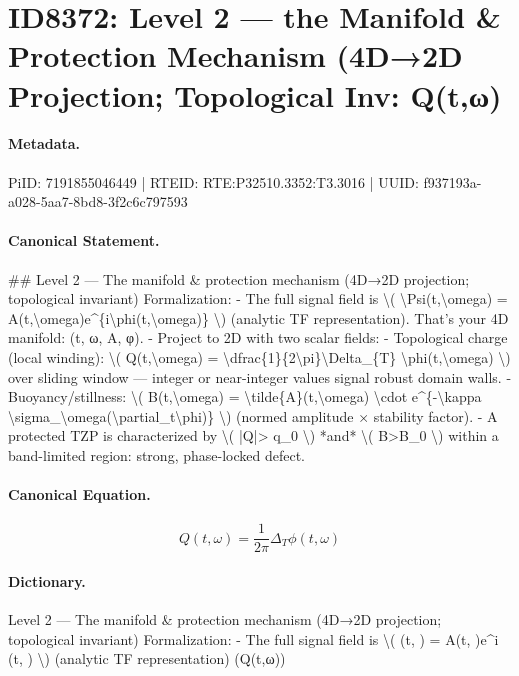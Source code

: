 \section*{ID8372: Level 2 — the Manifold \& Protection Mechanism (4D→2D Projection; Topological Inv: Q(t,ω)}
\paragraph{Metadata.}
PiID: 7191855046449 | RTEID: RTE:P32510.3352:T3.3016 | UUID: f937193a-a028-5aa7-8bd8-3f2c6c797593

\paragraph{Canonical Statement.}
\#\# Level 2 — The manifold \& protection mechanism (4D→2D projection; topological invariant) Formalization: - The full signal field is \textbackslash{}( \textbackslash{}Psi(t,\textbackslash{}omega) = A(t,\textbackslash{}omega)e\textasciicircum{}\{i\textbackslash{}phi(t,\textbackslash{}omega)\} \textbackslash{}) (analytic TF representation). That’s your 4D manifold: (t, ω, A, φ). - Project to 2D with two scalar fields: - Topological charge (local winding): \textbackslash{}( Q(t,\textbackslash{}omega) = \textbackslash{}dfrac\{1\}\{2\textbackslash{}pi\}\textbackslash{}Delta\_\{T\} \textbackslash{}phi(t,\textbackslash{}omega) \textbackslash{}) over sliding window — integer or near-integer values signal robust domain walls. - Buoyancy/stillness: \textbackslash{}( B(t,\textbackslash{}omega) = \textbackslash{}tilde\{A\}(t,\textbackslash{}omega) \textbackslash{}cdot e\textasciicircum{}\{-\textbackslash{}kappa \textbackslash{}sigma\_\textbackslash{}omega(\textbackslash{}partial\_t\textbackslash{}phi)\} \textbackslash{}) (normed amplitude × stability factor). - A protected TZP is characterized by \textbackslash{}( |Q|> q\_0 \textbackslash{}) *and* \textbackslash{}( B>B\_0 \textbackslash{}) within a band-limited region: strong, phase-locked defect.

\paragraph{Canonical Equation.}
\[
Q(t,\omega) = \dfrac{1}{2\pi}\Delta_{T} \phi(t,\omega)
\]

\paragraph{Dictionary.}
Level 2 — The manifold \& protection mechanism (4D→2D projection; topological invariant) Formalization: - The full signal field is \textbackslash{}( (t, ) = A(t, )e\textasciicircum{}i (t, ) \textbackslash{}) (analytic TF representation) (Q(t,ω))

